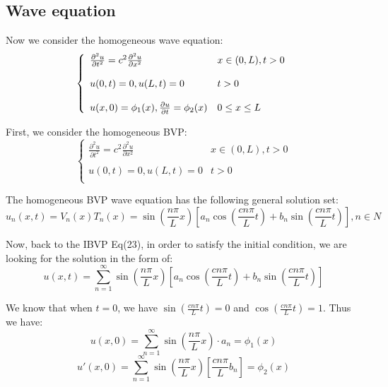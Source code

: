 \documentclass[12pt]{article} %
\begin{document}
\subsection{Wave equation}
\hspace{5mm}
Now we consider the homogeneous wave equation:
\begin{equation}
\left \{ \begin{array}{llc}
\frac{\partial^{2} u}{\partial t^{2}} =c^{2}\frac{\partial^{2}u}{\partial x^{2}} & x \in (0,L),  t>0 \\ 
\\
u(0,t) = 0, u(L, t) = 0& t>0 \\ 
\\
u(x, 0) = \phi_{1}(x), \pdv{u}{t} =\phi_{2}(x) & 0 \leq x \leq L
\end{array}\right.
\end{equation}\par
First, we consider the homogeneous BVP:
$$
\left \{ \begin{array}{llc}
\frac{\partial^{2} u}{\partial t^{2}} =c^{2}\frac{\partial^{2}u}{\partial x^{2}} & x \in (0,L),  t>0 \\ 
\\
u(0,t) = 0, u(L, t) = 0& t>0 \\ 
\end{array}\right.
$$
\par
The homogeneous BVP wave equation has the following general solution set:
$$
u_{n}(x, t) = V_{n}(x)T_{n}(x)=\sin(\frac{n\pi}{L}x)\left[a_{n}\cos(\frac{cn\pi}{L}t) +
 b_{n}\sin(\frac{cn\pi}{L}t)\right], n\in N
$$\par
Now, back to the IBVP Eq(23), in order to  satisfy the initial condition, we are looking for the solution in the form of:
\begin{equation}
u(x, t) = \sum_{n=1}^{\infty}\sin(\frac{n\pi}{L}x)\left[a_{n}\cos(\frac{cn\pi}{L}t) +
 b_{n}\sin(\frac{cn\pi}{L}t)\right]
\end{equation}
\par
We know that when $t = 0$, we have $\sin(\frac{cn\pi}{L}t)=0$ and $\cos(\frac{cn\pi}{L}t)=1$. Thus we have:
\begin{equation}
u(x, 0)=
\sum_{n=1}^{\infty}\sin(\frac{n\pi}{L}x)\cdot a_{n} = \phi_{1}(x)
\end{equation}
\begin{equation}
u'(x, 0) =
\sum_{n=1}^{\infty}\sin(\frac{n\pi}{L}x)\left[\frac{cn\pi}{L}
 b_{n}\right] = \phi_{2}(x)
\end{equation}\par
\end{document}
